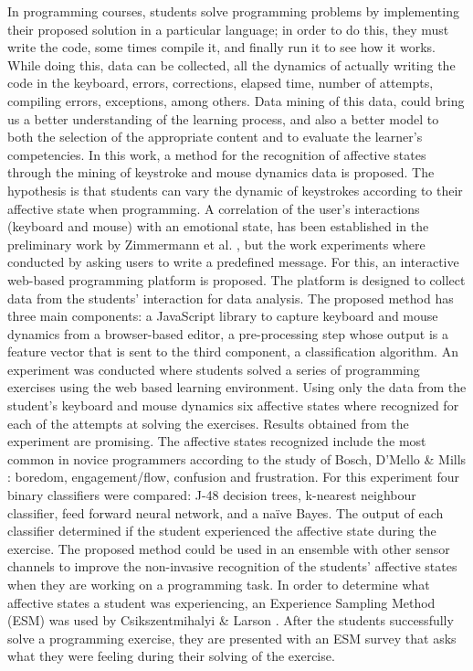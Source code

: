\documentclass[a4paper,twoside]{article}
\begin{document}
In programming courses, students solve programming problems by implementing their
proposed solution in a particular language; in order to do this, they must write the code,
some times compile it, and finally run it to see how it works. 
While doing this, data can be collected, all the dynamics of actually writing 
the code in the keyboard, errors, corrections, elapsed time, number of attempts,
compiling errors, exceptions, among others. Data mining of this data, could
bring us a better understanding of the learning process, and also a better model to 
both the selection of the appropriate content and to evaluate the learner’s competencies.
In this work, a method for the recognition of affective states through the
mining of keystroke and mouse dynamics data is proposed. 
The hypothesis is that students can vary the dynamic of keystrokes according 
to their affective state when programming. A correlation of the 
user’s interactions (keyboard and mouse) with an emotional state, has been 
established in the preliminary work by Zimmermann
et al. \cite{zimmermann2003affective}, but the work experiments where
conducted by asking users to write a predefined message. 
For this, an interactive web-based programming platform
is proposed. The platform is designed to collect data from the students'
interaction for data analysis.
The proposed method
has three main components: a JavaScript library to capture keyboard and mouse
dynamics from a browser-based editor, a pre-processing step whose output is a
feature vector that is sent to the third component, a classification algorithm.
An experiment was conducted where students solved a series of programming
exercises using the web based learning environment. Using only the data from the
student’s keyboard and mouse dynamics six affective states where recognized for
each of the attempts at solving the exercises. Results obtained from the
experiment are promising. The affective states recognized include the most
common in novice programmers according to the study of Bosch, D'Mello \& Mills
\cite{bixler2013detecting}: boredom, engagement/flow, confusion and frustration. For this experiment
four binary classifiers were compared: J-48 decision trees, k-nearest neighbour
classifier, feed forward neural network, and a na\"ive Bayes. The output of each
classifier determined if the student experienced the affective state during the
exercise. The proposed method could be used in an ensemble with other sensor
channels to improve the non-invasive recognition of the students’ affective
states when they are working on a programming task. In order to determine what
affective states a student was experiencing, an Experience Sampling Method (ESM)
was used by Csikszentmihalyi \& Larson \cite{kubey1996experience}. After the students successfully
solve a programming exercise, they are presented with an ESM survey that asks
what they were feeling during their solving of the exercise.
\end{document}
